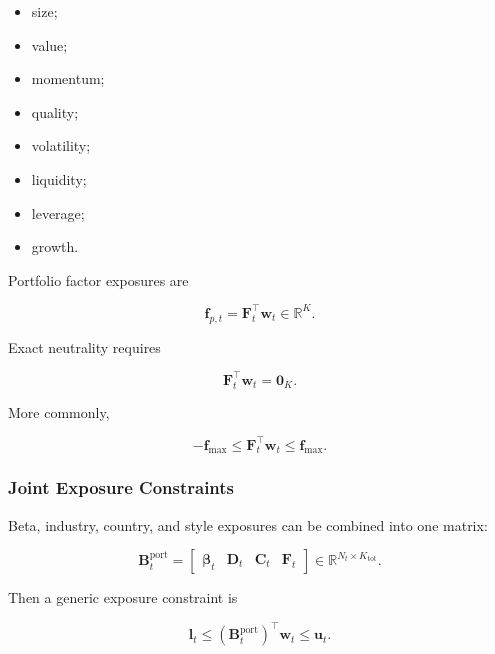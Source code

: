 \documentclass[11pt,a4paper]{article}
\begin{document}
\begin{itemize}
    \item size;
    \item value;
    \item momentum;
    \item quality;
    \item volatility;
    \item liquidity;
    \item leverage;
    \item growth.
\end{itemize}

Portfolio factor exposures are

\begin{equation}
\boxed{
\mathbf{f}_{p,t}
=
\mathbf{F}_t^\top
\mathbf{w}_t
\in
\mathbb{R}^{K}.
}
\end{equation}

Exact neutrality requires

\begin{equation}
\boxed{
\mathbf{F}_t^\top
\mathbf{w}_t
=
\mathbf{0}_{K}.
}
\end{equation}

More commonly,

\begin{equation}
-\mathbf{f}_{\max}
\leq
\mathbf{F}_t^\top
\mathbf{w}_t
\leq
\mathbf{f}_{\max}.
\end{equation}


\subsubsection{Joint Exposure Constraints}

Beta, industry, country, and style exposures can be combined into one matrix:

\begin{equation}
\boxed{
\mathbf{B}_t^{\mathrm{port}}
=
\begin{bmatrix}
\boldsymbol{\beta}_t
&
\mathbf{D}_t
&
\mathbf{C}_t
&
\mathbf{F}_t
\end{bmatrix}
\in
\mathbb{R}^{N_t\times K_{\mathrm{tot}}}.
}
\end{equation}

Then a generic exposure constraint is

\begin{equation}
\boxed{
\mathbf{l}_t
\leq
\left(
\mathbf{B}_t^{\mathrm{port}}
\right)^\top
\mathbf{w}_t
\leq
\mathbf{u}_t.
}
\end{equation}
\end{document}
